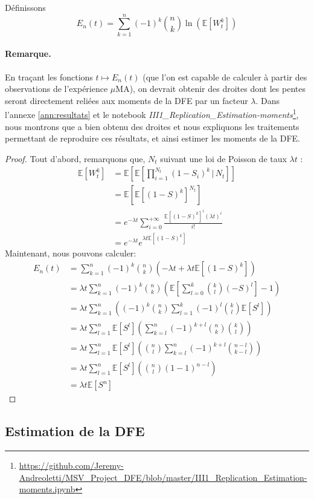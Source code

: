 \documentclass[12pt]{article}
\newtheorem{plain}{Proposition}[section]
\newcounter{prop}[section]
\newcommand{\req}[1]{\paragraph{Remarque.}#1\vspace{0.1cm}}
\newcommand{\prop}[1]{\begin{center}\fbox{\begin{minipage}{.8\linewidth}\begin{plain} #1\end{plain}\end{minipage}}\end{center}}
\newcommand{\pth}[1]{\left(#1\right)}
\newcommand{\cro}[1]{\left[#1\right]}
\newcommand{\En}{\mathbb{N}}
\newcommand{\Esp}[1]{\mathbb{E}\cro{#1}}
\newcommand{\kt }{\,|\,}
\begin{document}
Définissons \[E_n(t)=\sum_{k=1}^n(-1)^k\binom{n}{k}\ln\pth{\Esp{W_t^k}}\]

\prop{Pour $t\geqslant 0$ et $n\in\En$: \[E_n(t)=\pth{\lambda\Esp{S^n}}t\]}

\req{En traçant les fonctions $t\mapsto E_n(t)$ (que l'on est capable de calculer à partir des observations de l'expérience $\mu$MA), on devrait obtenir des droites dont les pentes seront directement reliées aux moments de la DFE par un facteur $\lambda$. Dans l'annexe \ref{ann:resultats} et le notebook \emph{III1\_Replication\_Estimation-moments}\footnote{\url{https://github.com/Jeremy-Andreoletti/MSV_Project_DFE/blob/master/III1_Replication_Estimation-moments.ipynb}}, nous montrons que \cite{rob} a bien obtenu des droites et nous expliquons les traitements permettant de reproduire ces résultats, et ainsi estimer les moments de la DFE.}

\begin{proof}
  Tout d'abord, remarquons que, $N_t$ suivant une loi de Poisson de taux $\lambda t$ :
  \begin{align*}
    \Esp{W_t^k}&=\Esp{\Esp{\prod_{i=1}^{N_t}(1-S_i)^k\kt N_t}}\\
    &=\Esp{\Esp{(1-S)^k}^{N_t}}\\
    &=e^{-\lambda t}\sum_{i=0}^{+\infty}\frac{\Esp{(1-S)^k}^i(\lambda t)^i}{i!}\\
    &=e^{-\lambda t}e^{\lambda t\Esp{(1-S)^k}}
  \end{align*}
  Maintenant, nous pouvons calculer:
  \begin{align*}
    E_n(t)&=\sum_{k=1}^n(-1)^k\binom{n}{k}\pth{-\lambda t+\lambda t\Esp{(1-S)^k}}\\
    &=\lambda t\sum_{k=1}^n(-1)^k\binom{n}{k}\pth{\Esp{\sum_{l=0}^k\binom{k}{l}\pth{-S}^l}-1}\\
    &=\lambda t\sum_{k=1}^n\pth{(-1)^k\binom{n}{k}\sum_{l=1}^k(-1)^l\binom{k}{l}\Esp{S^l}}\\
    &=\lambda t\sum_{l=1}^n\Esp{S^l}\pth{\sum_{k=l}^n(-1)^{k+l}\binom{n}{k}\binom{k}{l}}\\
    &=\lambda t\sum_{l=1}^n\Esp{S^l}\pth{\binom{n}{l}\sum_{k=l}^n(-1)^{k+l}\binom{n-l}{k-l}}\\
    &=\lambda t\sum_{l=1}^n\Esp{S^l}\pth{\binom{n}{l}(1-1)^{n-l}}\\
    &=\lambda t\Esp{S^n}
  \end{align*}
\end{proof}




\subsection{Estimation de la DFE}
\end{document}
